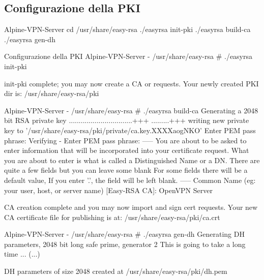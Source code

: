 \documentclass{article}
\begin{document}
\subsection{Configurazione della PKI}
\begin{commandshell}{Alpine-VPN-Server}
cd /usr/share/easy-rsa
./easyrsa init-pki
./easyrsa build-ca
./easyrsa gen-dh
\end{commandshell}

\begin{shelloutput}{Configurazione della PKI}
Alpine-VPN-Server - /usr/share/easy-rsa # ./easyrsa init-pki

init-pki complete; you may now create a CA or requests.
Your newly created PKI dir is: /usr/share/easy-rsa/pki

Alpine-VPN-Server - /usr/share/easy-rsa # ./easyrsa build-ca
Generating a 2048 bit RSA private key
................................+++
.........+++
writing new private key to '/usr/share/easy-rsa/pki/private/ca.key.XXXXaogNKO'
Enter PEM pass phrase:
Verifying - Enter PEM pass phrase:
-----
You are about to be asked to enter information that will be incorporated
into your certificate request.
What you are about to enter is what is called a Distinguished Name or a DN.
There are quite a few fields but you can leave some blank
For some fields there will be a default value,
If you enter '.', the field will be left blank.
-----
Common Name (eg: your user, host, or server name) [Easy-RSA CA]: OpenVPN Server

CA creation complete and you may now import and sign cert requests.
Your new CA certificate file for publishing is at:
/usr/share/easy-rsa/pki/ca.crt

Alpine-VPN-Server - /usr/share/easy-rsa #     ./easyrsa gen-dh
Generating DH parameters, 2048 bit long safe prime, generator 2
This is going to take a long time
... (...)

DH parameters of size 2048 created at /usr/share/easy-rsa/pki/dh.pem
\end{shelloutput}
\vspace{1em}
\end{document}
